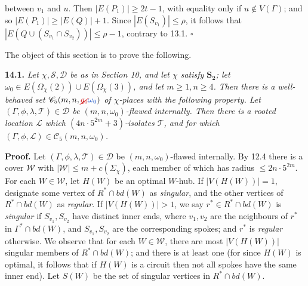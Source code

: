 \noindent between $v_1$ and $u$. Then $|E(P_1)| \ge 2t - 1$, with equality only if $u \notin V(\Gamma)$; and so $|E(P_1)| \ge |E(Q)| + 1$. Since $|E(S_{v_1})| \le \rho$, it follows that $|E(Q \cup (S_{v_1} \cap S_{v_2}))| \le \rho - 1$, contrary to 13.1. $\square$


The object of this section is to prove the following.

\textbf{14.1.} \textit{Let $\chi, \mathscr{S}, \mathscr{D}$ be as in Section 10, and let $\chi$ satisfy $\mathbf{S_2}$; let $\omega_0 \in E(\Omega_\chi(2)) \cup E(\Omega_\chi(3))$, and let $m \ge 1, n \ge 4$. Then there is a well-behaved set $\mathscr{C}_5(m, n, \delm{q_0}\fix{\omega_0})$ of $\chi$-places with the following property. Let $(\Gamma, \phi, \lambda, \mathscr{T}) \in \mathscr{D}$ be $(m, n, \omega_0)$-flawed internally. Then there is a rooted location $\mathscr{L}$ which $(4n \cdot 5^{2m} + 3)$-isolates $\mathscr{T}$, and for which $(\Gamma, \phi, \mathscr{L}) \in \mathscr{C}_5(m, n, \omega_0)$.}

\textbf{Proof.} Let $(\Gamma, \phi, \lambda, \mathscr{T}) \in \mathscr{D}$ be $(m, n, \omega_0)$-flawed internally. By 12.4 there is a cover $\mathscr{W}$ with $|\mathscr{W}| \le m + c(\Sigma_\chi)$, each member of which has radius $\le 2n \cdot 5^{2m}$. For each $W \in \mathscr{W}$, let $H(W)$ be an optimal $W$-hub. If $|V(H(W))| = 1$, designate some vertex of $R^* \cap bd(W)$ as \textit{singular}, and the other vertices of $R^* \cap bd(W)$ as \textit{regular}. If $|V(H(W))| > 1$, we say $r^* \in R^* \cap bd(W)$ is \textit{singular} if $S_{v_1}, S_{v_2}$ have distinct inner ends, where $v_1, v_2$ are the neighbours of $r^*$ in $\Gamma^* \cap bd(W)$, and $S_{v_1}, S_{v_2}$ are the corresponding spokes; and $r^*$ is \textit{regular} otherwise. We observe that for each $W \in \mathscr{W}$, there are most $|V(H(W))|$ singular members of $R^* \cap bd(W)$; and there is at least one (for since $H(W)$ is optimal, it follows that if $H(W)$ is a circuit then not all spokes have the same inner end). Let $S(W)$ be the set of singular vertices in $R^* \cap bd(W)$.

